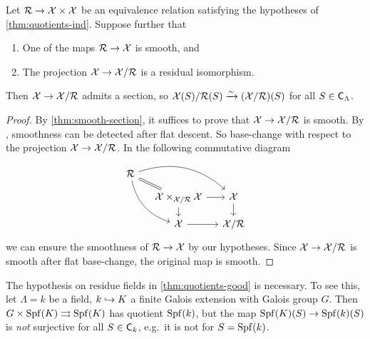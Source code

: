\documentclass[phd,cornellheadings,draft]{cornell}
\begin{document}
\begin{corollary}\label{thm:quotients-good}
Let $\mathcal{R}\to \mathcal{X}\times \mathcal{X}$ be an equivalence relation satisfying the hypotheses 
of \ref{thm:quotients-ind}. Suppose further that 
\begin{enumerate}
\item
One of the maps $\mathcal{R}\to \mathcal{X}$ is smooth, and 

\item
The projection $\mathcal{X}\to \mathcal{X}/\mathcal{R}$ is a residual isomorphism. 
\end{enumerate}
Then $\mathcal{X}\to \mathcal{X}/\mathcal{R}$ admits a section, so $\mathcal{X}(S)/\mathcal{R}(S)\xrightarrow\sim (\mathcal{X}/\mathcal{R})(S)$ 
for all $S\in \mathsf{C}_\Lambda$. 
\end{corollary}
\begin{proof}
By \ref{thm:smooth-section}, it suffices to prove that $\mathcal{X}\to \mathcal{X}/\mathcal{R}$ is 
smooth. By \cite[17.7.3(ii)]{ega4-4}, smoothness can be detected after flat 
descent. So base-change with respect to the projection $\mathcal{X}\to \mathcal{X}/\mathcal{R}$. In the 
following commutative diagram 
\[
\begin{tikzcd}[column sep=small, row sep=small]
	\cR \ar[dr, equal] \ar[drr, bend left] \ar[ddr, bend right] \\
	& \cX\times_{\cX/\cR}\cX \ar[r] \ar[d]
		& \cX \ar[d] \\
	& \cX \ar[r]
		& \cX/\cR
\end{tikzcd}
\]
we can ensure the smoothness of $\mathcal{R}\to \mathcal{X}$ by our hypotheses. Since  
$\mathcal{X}\to \mathcal{X}/\mathcal{R}$ is smooth after flat base-change, the original map is smooth. 
\end{proof}

\begin{example}
The hypothesis on residue fields in \ref{thm:quotients-good} is necessary. To 
see this, let $\Lambda=k$ be a field, $k\hookrightarrow K$ a finite Galois extension 
with Galois group $G$. Then $G\times \operatorname{Spf}(K)\rightrightarrows \operatorname{Spf}(K)$ has 
quotient $\operatorname{Spf}(k)$, but the map $\operatorname{Spf}(K)(S)\to \operatorname{Spf}(k)(S)$ is \emph{not} 
surjective for all $S\in \mathsf{C}_k$, e.g.~it is not for $S=\operatorname{Spf}(k)$. 
\end{example}
\end{document}
